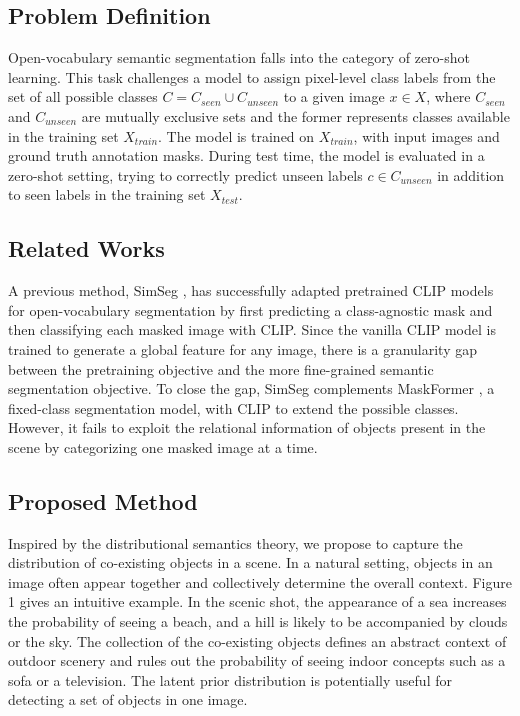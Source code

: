 \documentclass[10pt,twocolumn,letterpaper]{article}
\begin{document}
\subsection{Problem Definition}

Open-vocabulary semantic segmentation falls into the category of zero-shot learning. This task challenges a model to assign pixel-level class labels from the set of all possible classes $C=C_{seen} \cup C_{unseen}$ to a given image $x\in X$, where $C_{seen}$ and $C_{unseen}$ are mutually exclusive sets and the former represents classes available in the training set $X_{train}$. The model is trained on $X_{train}$, with input images and ground truth annotation masks. During test time, the model is evaluated in a zero-shot setting, trying to correctly predict unseen labels $c\in C_{unseen}$ in addition to seen labels in the training set $X_{test}$. 

\subsection{Related Works}

A previous method, SimSeg \cite{simseg}, has successfully adapted pretrained CLIP models \cite{clip} for open-vocabulary segmentation by first predicting a class-agnostic mask and then classifying each masked image with CLIP. Since the vanilla CLIP model is trained to generate a global feature for any image, there is a granularity gap between the pretraining objective and the more fine-grained semantic segmentation objective. To close the gap, SimSeg complements MaskFormer \cite{maskformer}, a fixed-class segmentation model, with CLIP to extend the possible classes. However, it fails to exploit the relational information of objects present in the scene by categorizing one masked image at a time.

\subsection{Proposed Method}

Inspired by the distributional semantics theory, we propose to capture the distribution of co-existing objects in a scene. In a natural setting, objects in an image often appear together and collectively determine the overall context. Figure 1 gives an intuitive example. In the scenic shot, the appearance of a sea increases the probability of seeing a beach, and a hill is likely to be accompanied by clouds or the sky. The collection of the co-existing objects defines an abstract context of outdoor scenery and rules out the probability of seeing indoor concepts such as a sofa or a television. The latent prior distribution is potentially useful for detecting a set of objects in one image. 
\end{document}
